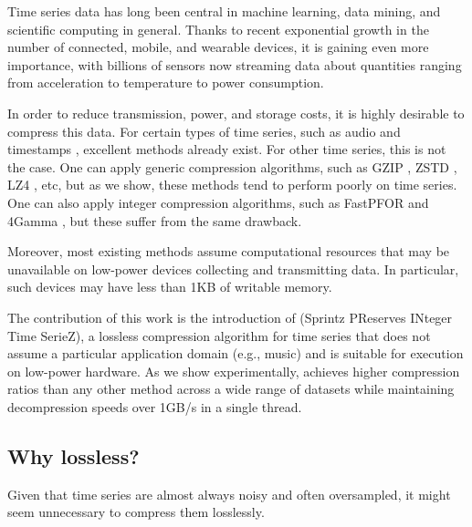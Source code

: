 
Time series data has long been central in machine learning, data mining, and scientific computing in general. Thanks to recent exponential growth in the number of connected, mobile, and wearable devices, it is gaining even more importance, with billions of sensors now streaming data about quantities ranging from acceleration to temperature to power consumption.

In order to reduce transmission, power, and storage costs, it is highly desirable to compress this data. For certain types of time series, such as audio \cite{flac, shorten} and timestamps \cite{gorillaDB, fastpfor}, excellent methods already exist. For other time series, this is not the case. One can apply generic compression algorithms, such as GZIP \cite{gzip}, ZSTD \cite{zstd}, LZ4 \cite{lz4}, etc, but as we show, these methods tend to perform poorly on time series. One can also apply integer compression algorithms, such as FastPFOR \cite{fastpfor} and 4Gamma \cite{TODO}, but these suffer from the same drawback.

Moreover, most existing methods assume computational resources that may be unavailable on low-power devices collecting and transmitting data. In particular, such devices may have less than 1KB of writable memory.

The contribution of this work is the introduction of \mine (Sprintz PReserves INteger Time SerieZ), a lossless compression algorithm for time series that does not assume a particular application domain (e.g., music) and is suitable for execution on low-power hardware. As we show experimentally, \mine achieves higher compression ratios than any other method across a wide range of datasets while maintaining decompression speeds over 1GB/s in a single thread.

\subsection{Why lossless?}



Given that time series are almost always noisy and often oversampled, it might seem unnecessary to compress them losslessly. %

